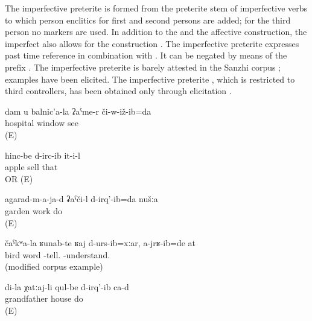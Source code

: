 The imperfective preterite is formed from the preterite stem of imperfective verbs to which person enclitics for first and second persons are added; for the third person no markers are used. In addition to the  and the affective construction, the imperfect also allows for the  construction . The imperfective preterite expresses past time reference in combination with . It can be negated by means of the prefix . The imperfective preterite is barely attested in the Sanzhi corpus ; examples  have been elicited. The imperfective preterite , which is restricted to third  controllers, has been obtained only through elicitation .
%
\begin{exe}
	\ex	\label{ex:I saw you (repeatedly) from the window of the hospital}
	\gll	dam	u	balnic’a-la	ʡaˁme-r	či-w-iž-ib=da\\
				hospital	window	see\\
	\glt	{} (E)

	\ex	\label{ex:S/he sold apples analytic}
	\gll	hinc-be	d-irc-ib	it-i-l\\
		apple	sell	that\\
	\glt	{} OR  (E)

	\ex	\label{ex:We (repeatedly) worked in the garden}
	\gll	agarad-m-a-ja-d	ʡaˁči-l	d-irq'-ib=da	nušːa\\
		garden	work	do	\\
	\glt	{} (E)

	\ex	\label{ex:Although I said words like a bird, you did not understand them}
	\gll	čaˁkʷa-la	ʁunab-te	ʁaj	d-urs-ib=xːar,	a-jrʁ-ib=de	at\\
		bird	 	word	-tell.	-understand.	\\
	\glt	{} (modified corpus example)
	
	\ex	\label{ex:My grandfather (apparently) built houses analytic}
	\gll	di-la	χatːaj-li	qul-be	d-irq'-ib	ca-d\\
			grandfather	house	do	\\
	\glt	{} (E)

\end{exe}

